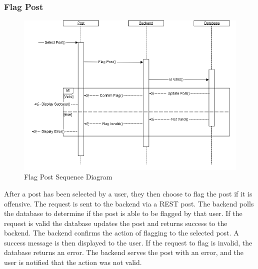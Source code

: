         \subsubsection{Flag Post}
            \begin{figure}[H]
                \centering
                \includegraphics[width=\textwidth]{src/img/flag-post.png}
                \caption{Flag Post Sequence Diagram} 
            \end{figure}

            After a post has been selected by a user, they then choose to flag
            the post if it is offensive. The request is sent to the backend via
            a REST post. The backend polls the database to determine if the post
            is able to be flagged by that user. If the request is valid the
            database updates the post and returns success to the backend. The
            backend confirms the action of flagging to the selected post. A
            success message is then displayed to the user. If the request to
            flag is invalid, the database returns an error. The backend serves
            the post with an error, and the user is notified that the action was
            not valid. 

